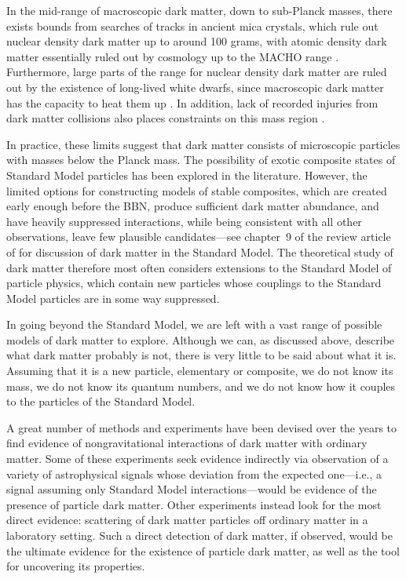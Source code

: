 In the mid-range of macroscopic dark matter, down to sub-Planck masses, there exists bounds from searches of tracks in ancient mica crystals, which rule out nuclear density dark matter up to around 100 grams, with atomic density dark matter essentially ruled out by cosmology up to the MACHO range \parencite{JacobsStarkmanLynn2015}. Furthermore, large parts of the range for nuclear density dark matter are ruled out by the existence of long-lived white dwarfs, since macroscopic dark matter has the capacity to heat them up \parencite{Graham2018}. In addition, lack of recorded injuries from dark matter collisions also places constraints on this mass region \parencite{SidhuScherrerStarkman2020}.

In practice, these limits suggest that dark matter consists of microscopic particles with masses below the Planck mass. The possibility of exotic composite states of Standard Model particles has been explored in the literature. However, the limited options for constructing models of stable composites, which are created early enough before the BBN, produce sufficient dark matter abundance, and have heavily suppressed interactions, while being consistent with all other observations, leave few plausible candidates---see chapter~9 of the review article of \textcite{CirelliStrumiaZupan2024} for discussion of dark matter in the Standard Model. The theoretical study of dark matter therefore most often considers extensions to the Standard Model of particle physics, which contain new particles whose couplings to the Standard Model particles are in some way suppressed.

In going beyond the Standard Model, we are left with a vast range of possible models of dark matter to explore. Although we can, as discussed above, describe what dark matter probably is not, there is very little to be said about what it is. Assuming that it is a new particle, elementary or composite, we do not know its mass, we do not know its quantum numbers, and we do not know how it couples to the particles of the Standard Model.

A great number of methods and experiments have been devised over the years to find evidence of nongravitational interactions of dark matter with ordinary matter. Some of these experiments seek evidence indirectly via observation of a variety of astrophysical signals whose deviation from the expected one---i.e., a signal assuming only Standard Model interactions---would be evidence of the presence of particle dark matter. Other experiments instead look for the most direct evidence: scattering of dark matter particles off ordinary matter in a laboratory setting. Such a direct detection of dark matter, if observed, would be the ultimate evidence for the existence of particle dark matter, as well as the tool for uncovering its properties.

